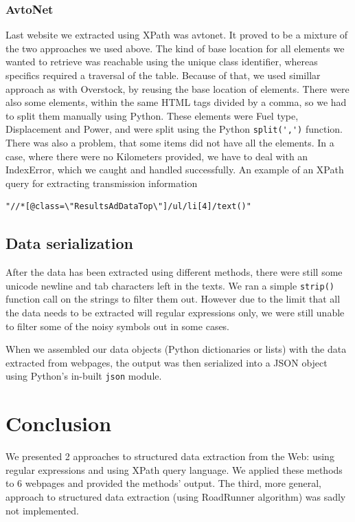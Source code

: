 \documentclass[9pt]{IEEEtran}
\begin{document}
\subsubsection{AvtoNet}
Last website we extracted using XPath was avtonet. It proved to be a mixture of the two approaches we used above. The kind of base location for all elements we wanted to retrieve was reachable using the unique class identifier, whereas specifics required a traversal of the table. 
Because of that, we used simillar approach as with Overstock, by reusing the base location of elements.
There were also some elements, within the same HTML tags divided by a comma, so we had to split them manually using Python.
These elements were Fuel type, Displacement and Power, and were split using the Python \verb/split(',')/ function. 
There was also a problem, that some items did not have all the elements. In a case, where there were no Kilometers provided, we have to deal with an IndexError, which we caught and handled successfully. 
An example of an XPath query for extracting transmission information
\begin{verbatim}
"//*[@class=\"ResultsAdDataTop\"]/ul/li[4]/text()"
\end{verbatim}

\subsection{Data serialization}
After the data has been extracted using different methods, there were still some unicode newline and tab characters left in the texts. We ran a simple \texttt{strip()} function call on the strings to filter them out.
However due to the limit that all the data needs to be extracted will regular expressions only, we were still unable to filter some of the noisy symbols out in some cases.

When we assembled our data objects (Python dictionaries or lists) with the data extracted from webpages, the output was then serialized into a JSON object using Python's in-built \verb/json/ module.

\section{Conclusion}
\label{section:conclusion}
We presented 2 approaches to structured data extraction from the Web: using regular expressions and using XPath query language.
We applied these methods to 6 webpages and provided the methods' output.
The third, more general, approach to structured data extraction (using RoadRunner algorithm) was sadly not implemented.
\end{document}
